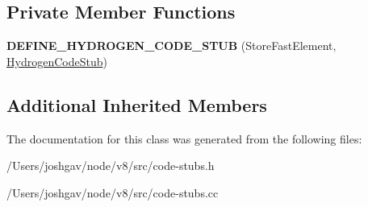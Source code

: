 \subsection*{Private Member Functions}
\begin{DoxyCompactItemize}
\item 
{\bfseries D\+E\+F\+I\+N\+E\+\_\+\+H\+Y\+D\+R\+O\+G\+E\+N\+\_\+\+C\+O\+D\+E\+\_\+\+S\+T\+UB} (Store\+Fast\+Element, \hyperlink{classv8_1_1internal_1_1_hydrogen_code_stub}{Hydrogen\+Code\+Stub})\hypertarget{classv8_1_1internal_1_1_store_fast_element_stub_a0a07b5a4acdac0b3d22df943b4811c62}{}\label{classv8_1_1internal_1_1_store_fast_element_stub_a0a07b5a4acdac0b3d22df943b4811c62}

\end{DoxyCompactItemize}
\subsection*{Additional Inherited Members}


The documentation for this class was generated from the following files\+:\begin{DoxyCompactItemize}
\item 
/\+Users/joshgav/node/v8/src/code-\/stubs.\+h\item 
/\+Users/joshgav/node/v8/src/code-\/stubs.\+cc\end{DoxyCompactItemize}
